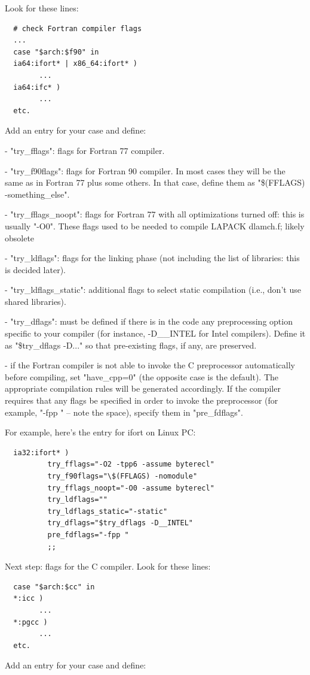 \documentclass[12pt,a4paper]{article}
\begin{document}
\begin{enumerate}
Look for these lines:
\begin{verbatim}
  # check Fortran compiler flags
  ...
  case "$arch:$f90" in
  ia64:ifort* | x86_64:ifort* )
        ...
  ia64:ifc* )
        ...
  etc.
\end{verbatim}
Add an entry for your case and define:

- "try\_fflags": flags for Fortran 77 compiler.

- "try\_f90flags": flags for Fortran 90 compiler.
In most cases they will be the same as in Fortran 77 plus some
others.  In that case, define them as "\$(FFLAGS) -something\_else".

- "try\_fflags\_noopt": flags for Fortran 77 with all optimizations
turned off: this is usually "-O0".
These flags used to be needed to compile LAPACK dlamch.f; likely obsolete

- "try\_ldflags": flags for the linking phase (not including the list
of libraries: this is decided later).

- "try\_ldflags\_static": additional flags to select static compilation
(i.e., don't use shared libraries).

- "try\_dflags": must be defined if there is in the code any preprocessing
option specific to your compiler (for instance, -D\_\_INTEL for Intel
compilers).  Define it as "\$try\_dflags -D..." so that pre-existing
flags, if any, are preserved.

- if the Fortran compiler is not able to invoke the C preprocessor
automatically before compiling, set "have\_cpp=0" (the opposite case
is the default). The appropriate compilation rules will be generated
accordingly. If the compiler requires that any flags be specified in
order to invoke the preprocessor (for example, "-fpp " -- note the
space), specify them in "pre\_fdflags".

For example, here's the entry for ifort on Linux PC:
\begin{verbatim}
  ia32:ifort* )
          try_fflags="-O2 -tpp6 -assume byterecl"
          try_f90flags="\$(FFLAGS) -nomodule"
          try_fflags_noopt="-O0 -assume byterecl"
          try_ldflags=""
          try_ldflags_static="-static"
          try_dflags="$try_dflags -D__INTEL"
          pre_fdflags="-fpp "
          ;;
\end{verbatim}
Next step: flags for the C compiler. Look for these lines:
\begin{verbatim}
  case "$arch:$cc" in
  *:icc )
        ...
  *:pgcc )
        ...
  etc.
\end{verbatim}
Add an entry for your case and define:


\end{enumerate}
\end{document}
